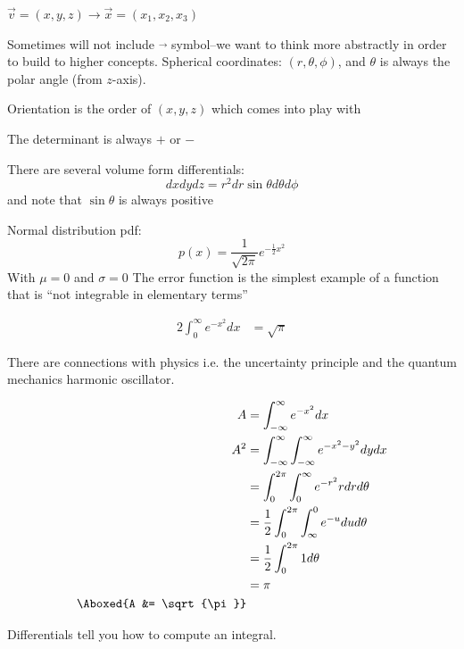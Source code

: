 \documentclass{scrreprt}
\begin{document}
\begin{definition}

$\vec{v}=(x,y,z)\rightarrow \vec{x}=(x_1,x_2,x_3)$

Sometimes will not include $\vec{}$ symbol--we want to think more abstractly in order to build to higher concepts.
Spherical coordinates: $(r,\theta,\phi)$, and $\theta$ is always the polar angle (from $z$-axis).

Orientation is the order of $(x, y, z)$ which comes into play with 

\end{definition}

\begin{remark}
	The determinant is always $+$ or $-$
\end{remark}

There are several volume form differentials:
\[
	dxdydz = r^2dr\sin \theta d\theta d\phi
\]
and note that $\sin \theta$ is always positive

\begin{remark}
	Normal distribution pdf: \[p(x)=\frac{1}{\sqrt{2\pi}}e^{-\frac{1}{2}x^2}\]
	With $\mu=0$ and $\sigma=0$
	The error function is the simplest example of a function that is ``not integrable in elementary terms''

	\begin{align*}
		2 \int_0^\infty e^{-x^2}dx &= \sqrt{\pi}
	\end{align*}

	There are connections with physics i.e. the uncertainty principle and the quantum mechanics harmonic oscillator.

	\begin{align*}
		A &= \int_{-\infty}^{\infty} e^{-x^2}dx \\
		A^2 &= \int_{-\infty}^{\infty} \int_{-\infty}^{\infty} e^{-x^2 - y^2} dydx \\
			&= \int_{0}^{2\pi}\int_{0}^{\infty} e^{-r^2}rdrd\theta \\
			&= \frac{1}{2}\int_{0}^{2\pi} \int_{\infty}^{0} e^{-u}dud\theta \\
			&= \frac{1}{2}\int_{0}^{2\pi} 1 d\theta \\
			&= \pi \\
			\Aboxed{A &= \sqrt{\pi}}
	\end{align*}
\end{remark}

Differentials tell you how to compute an integral.
\end{document}
